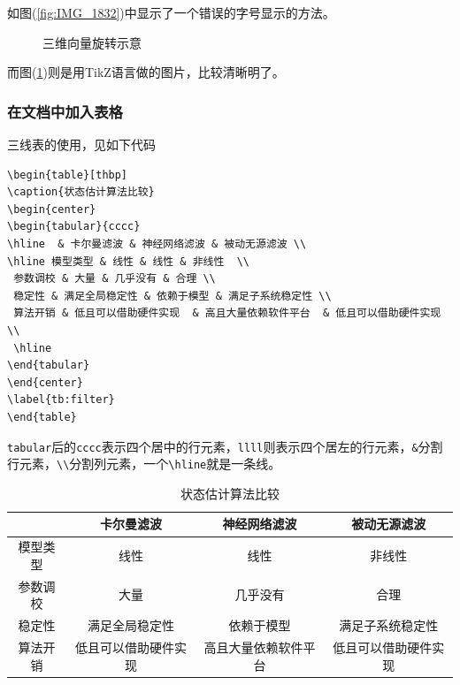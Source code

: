 如图(\ref{fig:IMG_1832})中显示了一个错误的字号显示的方法。
\begin{figure}[h]
\centering
{}
\caption{三维向量旋转示意}
\label{fig:3Drot}
\end{figure}

而图(\ref{fig:3Drot})则是用TikZ语言做的图片，比较清晰明了。
\subsubsection{在文档中加入表格}
三线表的使用，见如下代码
\begin{verbatim}
\begin{table}[thbp]
\caption{状态估计算法比较}
\begin{center}
\begin{tabular}{cccc}
\hline  & 卡尔曼滤波 & 神经网络滤波 & 被动无源滤波 \\ 
\hline 模型类型 & 线性 & 线性 & 非线性  \\ 
 参数调校 & 大量 & 几乎没有 & 合理 \\ 
 稳定性 & 满足全局稳定性 & 依赖于模型 & 满足子系统稳定性 \\ 
 算法开销 & 低且可以借助硬件实现  & 高且大量依赖软件平台  & 低且可以借助硬件实现  \\ 
 \hline
\end{tabular} 
\end{center}
\label{tb:filter}
\end{table}
\end{verbatim}
\verb|tabular|后的\verb|cccc|表示四个居中的行元素，\verb|llll|则表示四个居左的行元素，\verb|&|分割行元素，\verb|\\|分割列元素，一个\verb|\hline|就是一条线。
\begin{table}[thbp]
\caption{状态估计算法比较}
\begin{center}
\begin{tabular}{cccc}
\hline  & 卡尔曼滤波 & 神经网络滤波 & 被动无源滤波 \\ 
\hline 模型类型 & 线性 & 线性 & 非线性  \\ 
 参数调校 & 大量 & 几乎没有 & 合理 \\ 
 稳定性 & 满足全局稳定性 & 依赖于模型 & 满足子系统稳定性 \\ 
 算法开销 & 低且可以借助硬件实现  & 高且大量依赖软件平台  & 低且可以借助硬件实现  \\ 
 \hline
\end{tabular} 
\end{center}
\label{tb:filter}
\end{table}

